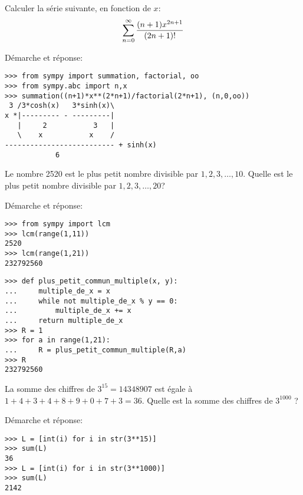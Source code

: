 \begin{question}[2 pts]
    Calculer la série suivante, en fonction de $x$:
    \[
	\sum_{n=0}^{\infty} {(n+1)x^{2n+1}\over (2n+1)!}
    \]
\begin{mybox}
Démarche et réponse:
\begin{reponse}
\begin{verbatim}
>>> from sympy import summation, factorial, oo
>>> from sympy.abc import n,x
>>> summation((n+1)*x**(2*n+1)/factorial(2*n+1), (n,0,oo))
 3 /3*cosh(x)   3*sinh(x)\
x *|--------- - ---------|
   |     2           3   |
   \    x           x    /
-------------------------- + sinh(x)
            6
\end{verbatim}
\end{reponse}
\end{mybox}
\end{question}



\newpage
\begin{question}[2 pts]
    Le nombre 2520 est le plus petit nombre divisible par
    $1, 2, 3, \dots, 10$.
    Quelle est le plus petit nombre divisible par 
    $1, 2, 3, \dots, 20$?
\begin{mybox}
Démarche et réponse:\\
\begin{reponse}
\begin{minipage}[t]{.40\textwidth}
\begin{verbatim}
>>> from sympy import lcm
>>> lcm(range(1,11))
2520
>>> lcm(range(1,21))
232792560
\end{verbatim}
\end{minipage}
\begin{minipage}[t]{0.5\textwidth}
\begin{verbatim}
>>> def plus_petit_commun_multiple(x, y):
...     multiple_de_x = x
...     while not multiple_de_x % y == 0:
...         multiple_de_x += x
...     return multiple_de_x
>>> R = 1
>>> for a in range(1,21):
...     R = plus_petit_commun_multiple(R,a)
>>> R
232792560
\end{verbatim}
\end{minipage}
\end{reponse}
\end{mybox}
\end{question}



\begin{question}[1 pts]
    La somme des chiffres de $3^{15}=14348907$ est égale à 
    $1+4+3+4+8+9+0+7+3=36$.
    Quelle est la somme des chiffres de $3^{1000}$ ?
\begin{mybox}
Démarche et réponse:
\begin{reponse}
\begin{verbatim}
>>> L = [int(i) for i in str(3**15)]
>>> sum(L)
36
>>> L = [int(i) for i in str(3**1000)]
>>> sum(L)
2142
\end{verbatim}
\end{reponse}
\end{mybox}
\end{question}

